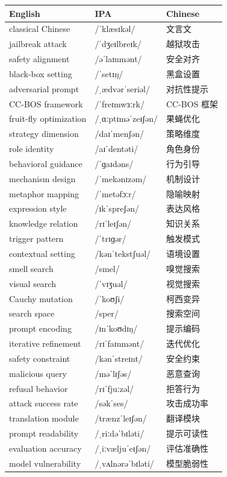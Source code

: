\documentclass[UTF8,12pt,a4paper]{ctexart}
\providecommand{\zh}[1]{#1}
\begin{document}
\begin{tabular*}{\textwidth}{@{\extracolsep{\fill}}lll@{}}
\toprule
\textbf{English} & \textbf{IPA} & \textbf{Chinese} \\
\midrule
classical Chinese & {\ipafont /ˈklæsɪkəl/} & \zh{文言文} \\
jailbreak attack & {\ipafont /ˈdʒeɪlbreɪk/} & \zh{越狱攻击} \\
safety alignment & {\ipafont /əˈlaɪnmənt/} & \zh{安全对齐} \\
black-box setting & {\ipafont /ˈsetɪŋ/} & \zh{黑盒设置} \\
adversarial prompt & {\ipafont /ˌædvərˈseriəl/} & \zh{对抗性提示} \\
CC-BOS framework & {\ipafont /ˈfreɪmwɜːrk/} & \zh{CC-BOS 框架} \\
fruit-fly optimization & {\ipafont /ˌɑːptɪməˈzeɪʃən/} & \zh{果蝇优化} \\
strategy dimension & {\ipafont /daɪˈmenʃən/} & \zh{策略维度} \\
role identity & {\ipafont /aɪˈdentəti/} & \zh{角色身份} \\
behavioral guidance & {\ipafont /ˈɡaɪdəns/} & \zh{行为引导} \\
mechanism design & {\ipafont /ˈmekənɪzəm/} & \zh{机制设计} \\
metaphor mapping & {\ipafont /ˈmetəfɔːr/} & \zh{隐喻映射} \\
expression style & {\ipafont /ɪkˈspreʃən/} & \zh{表达风格} \\
knowledge relation & {\ipafont /rɪˈleɪʃən/} & \zh{知识关系} \\
trigger pattern & {\ipafont /ˈtrɪɡər/} & \zh{触发模式} \\
contextual setting & {\ipafont /kənˈtekstʃuəl/} & \zh{语境设置} \\
smell search & {\ipafont /smel/} & \zh{嗅觉搜索} \\
visual search & {\ipafont /ˈvɪʒuəl/} & \zh{视觉搜索} \\
Cauchy mutation & {\ipafont /ˈkoʊʃi/} & \zh{柯西变异} \\
search space & {\ipafont /sper/} & \zh{搜索空间} \\
prompt encoding & {\ipafont /ɪnˈkoʊdɪŋ/} & \zh{提示编码} \\
iterative refinement & {\ipafont /rɪˈfaɪnmənt/} & \zh{迭代优化} \\
safety constraint & {\ipafont /kənˈstreɪnt/} & \zh{安全约束} \\
malicious query & {\ipafont /məˈlɪʃəs/} & \zh{恶意查询} \\
refusal behavior & {\ipafont /rɪˈfjuːzəl/} & \zh{拒答行为} \\
attack success rate & {\ipafont /səkˈses/} & \zh{攻击成功率} \\
translation module & {\ipafont /trænzˈleɪʃən/} & \zh{翻译模块} \\
prompt readability & {\ipafont /ˌriːdəˈbɪləti/} & \zh{提示可读性} \\
evaluation accuracy & {\ipafont /ˌiːvæljuˈeɪʃən/} & \zh{评估准确性} \\
model vulnerability & {\ipafont /ˌvʌlnərəˈbɪləti/} & \zh{模型脆弱性} \\
\bottomrule
\end{tabular*}
\end{document}
